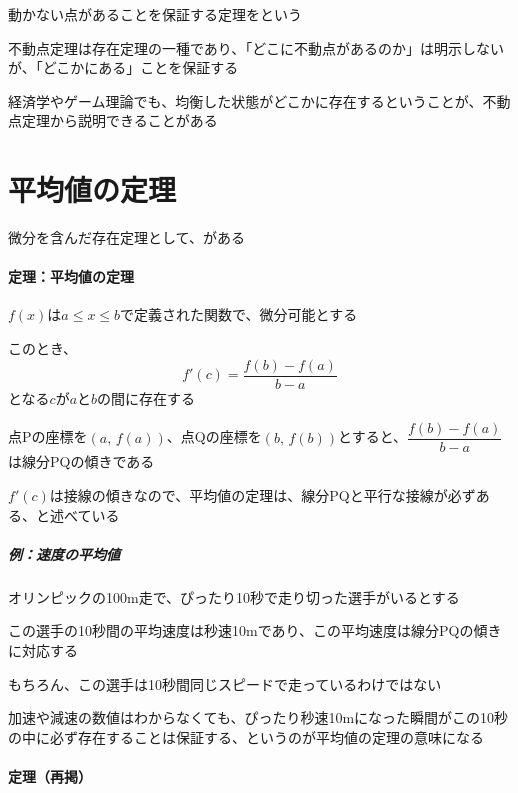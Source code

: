 \documentclass[../book_jiriki_calc]{subfiles}
\begin{document}
動かない点があることを保証する定理をという

不動点定理は存在定理の一種であり、「どこに不動点があるのか」は明示しないが、「どこかにある」ことを保証する

経済学やゲーム理論でも、均衡した状態がどこかに存在するということが、不動点定理から説明できることがある

\section{平均値の定理}

微分を含んだ存在定理として、がある

\sectionline

\paragraph{定理：平均値の定理}

$f(x)$は$a \leq x \leq b$で定義された関数で、微分可能とする

このとき、
\begin{equation*}
  f'(c) = \frac{f(b) - f(a)}{b - a}
\end{equation*}
となる$c$が$a$と$b$の間に存在する

\sectionline

点Pの座標を$(a,\,f(a))$、点Qの座標を$(b,\,f(b))$とすると、$\dfrac{f(b) - f(a)}{b - a}$は線分PQの傾きである

$f'(c)$は接線の傾きなので、平均値の定理は、線分PQと平行な接線が必ずある、と述べている

\sectionline

\subparagraph{例：速度の平均値}

オリンピックの100m走で、ぴったり10秒で走り切った選手がいるとする

この選手の10秒間の平均速度は秒速10mであり、この平均速度は線分PQの傾きに対応する

\br

もちろん、この選手は10秒間同じスピードで走っているわけではない

加速や減速の数値はわからなくても、ぴったり秒速10mになった瞬間がこの10秒の中に必ず存在することは保証する、というのが平均値の定理の意味になる

\sectionline

\paragraph{定理（再掲）}
\end{document}
